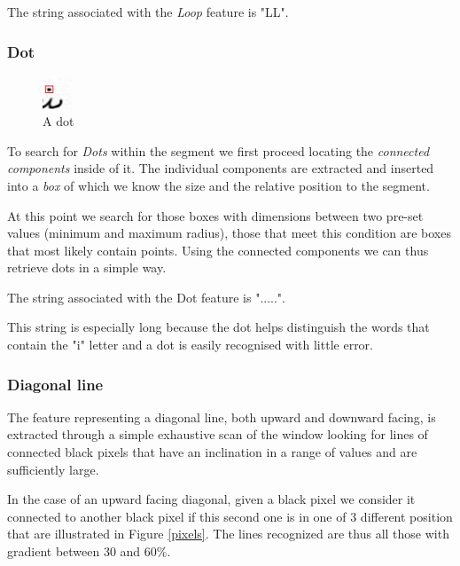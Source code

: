 The string associated with the \textit{Loop} feature is "LL".
\subsubsection{Dot}

\begin{figure}
  \vspace{-20pt}
  \begin{center}
    \includegraphics[width=0.08\textwidth]{images/dot}
  \end{center}
  \vspace{-20pt}
  \caption{A dot}
  \vspace{-10pt}
\end{figure}

To search for \textit{Dots} within the segment we first proceed locating the \emph{connected components} inside of it. The individual components are extracted and inserted into a \emph{box} of which we know the size and the relative position to the segment.


At this point we search for those boxes with dimensions between two pre-set values (minimum and maximum radius), those that meet this condition are boxes that most likely contain  points.
Using the connected components we can thus retrieve dots in a simple way.

The string associated with the Dot feature is ".....".

This string is especially long because the dot helps distinguish the words that contain the "i" letter and a dot is easily recognised with little error.

\subsubsection{Diagonal line}

The feature representing a diagonal line, both upward and downward facing, is extracted through a simple exhaustive scan of the window looking for lines of connected black pixels that have an inclination in a range of values and are sufficiently large.

In the case of an upward facing diagonal, given a black pixel we consider it connected to another black pixel if this second one is in one of 3 different position that are illustrated in Figure \ref{pixels}. The lines recognized are thus all those with gradient between 30 and 60\%.

